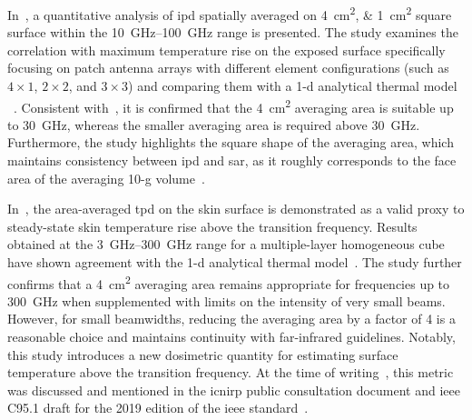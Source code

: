 In~\cite{Funahashi2018Averaging}, a quantitative analysis of \gls{ipd} spatially averaged on \SIlist{4;1}{\cm\squared} square surface within the \SIrange{10}{100}{\GHz} range is presented.
The study examines the correlation with maximum temperature rise on the exposed surface specifically focusing on patch antenna arrays with different element configurations (such as $4 \times 1$, $2 \times 2$, and $3 \times 3$) and comparing them with a \gls{1-d} analytical thermal model ~\cite{Foster2017Thermal}.
Consistent with~\cite{Hashimoto2017averaging}, it is confirmed that the \SI{4}{\cm\squared} averaging area is suitable up to \SI{30}{\GHz}, whereas the smaller averaging area is required above \SI{30}{\GHz}.
Furthermore, the study highlights the square shape of the averaging area, which maintains consistency between \gls{ipd} and \gls{sar}, as it roughly corresponds to the face area of the averaging 10-g volume~\cite{Hirata2019Setting}.

In~\cite{Funahashi2018Area-averaged}, the area-averaged \gls{tpd} on the skin surface is demonstrated as a valid proxy to steady-state skin temperature rise above the transition frequency.
Results obtained at the \SIrange{3}{300}{\GHz} range for a multiple-layer homogeneous cube have shown agreement with the \gls{1-d} analytical thermal model~\cite{Foster2017Thermal}.
The study further confirms that a \SI{4}{\cm\squared} averaging area remains appropriate for frequencies up to \SI{300}{\GHz} when supplemented with limits on the intensity of very small beams.
However, for small beamwidths, reducing the averaging area by a factor of \num{4} is a reasonable choice and maintains continuity with far-infrared guidelines.
Notably, this study introduces a new dosimetric quantity for estimating surface temperature above the transition frequency.
At the time of writing~\cite{Funahashi2018Averaging}, this metric was discussed and mentioned in the \gls{icnirp} public consultation document and \gls{ieee} C95.1 draft for the 2019 edition of the \gls{ieee} standard~\cite{IEEE2019Standard}.

